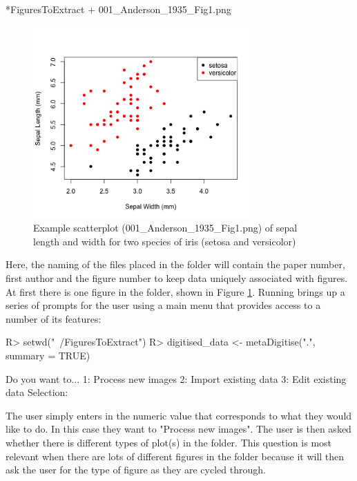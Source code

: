 \documentclass[article]{jss}
\newcommand{\fct}[1]{\code{#1()}}
\begin{document}
\begin{CodeChunk}
\begin{CodeOutput}
*FiguresToExtract
    + 001_Anderson_1935_Fig1.png
\end{CodeOutput}
\end{CodeChunk}

\begin{figure}[!h] 
 \includegraphics[width=0.75\textwidth]{001_Anderson_1935_Fig1.png} 
 \caption{Example scatterplot (001\_Anderson\_1935\_Fig1.png) of sepal length and width for two species of iris (setosa and versicolor)}
\label{fig:Anderson}
\end{figure}

Here, the naming of the files placed in the folder will contain the paper number, first author and the figure number to keep data uniquely associated with figures. At first there is one figure in the folder, shown in Figure \ref{fig:Anderson}. Running \fct{metaDigitise} brings up a series of prompts for the user using a main menu that provides access to a number of its features: 

\begin{CodeChunk}
\begin{CodeInput}
R> setwd("~/FiguresToExtract")
R> digitised_data <- metaDigitise(".", summary = TRUE)
\end{CodeInput}
\begin{CodeOutput}
	Do you want to...
1: Process new images
2: Import existing data
3: Edit existing data
Selection: 
\end{CodeOutput}
\end{CodeChunk}

The user simply enters in the numeric value that corresponds to what they would like to do. In this case they want to "Process new images". The user is then asked whether there is different types of plot(s) in the folder. This question is most relevant when there are lots of different figures in the folder because it will then ask the user for the type of figure as they are cycled through.
\end{document}
